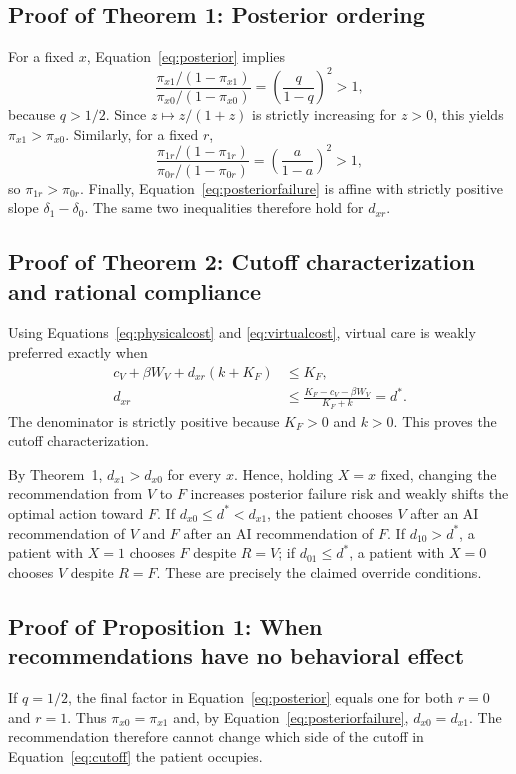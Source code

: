 \documentclass[11pt]{article}
\begin{document}
\subsection{Proof of Theorem 1: Posterior ordering}

For a fixed $x$, Equation~\eqref{eq:posterior} implies
\[
 \frac{\pi_{x1}/(1-\pi_{x1})}{\pi_{x0}/(1-\pi_{x0})}
 =\left(\frac{q}{1-q}\right)^2>1,
\]
because $q>1/2$.  Since $z\mapsto z/(1+z)$ is strictly increasing for $z>0$, this yields $\pi_{x1}>\pi_{x0}$.  Similarly, for a fixed $r$,
\[
 \frac{\pi_{1r}/(1-\pi_{1r})}{\pi_{0r}/(1-\pi_{0r})}
 =\left(\frac{a}{1-a}\right)^2>1,
\]
so $\pi_{1r}>\pi_{0r}$.  Finally, Equation~\eqref{eq:posteriorfailure} is affine with strictly positive slope $\delta_1-\delta_0$.  The same two inequalities therefore hold for $d_{xr}$.

\subsection{Proof of Theorem 2: Cutoff characterization and rational compliance}

Using Equations~\eqref{eq:physicalcost} and \eqref{eq:virtualcost}, virtual care is weakly preferred exactly when
\begin{align*}
 c_V+\beta W_V+d_{xr}(k+K_F)&\leq K_F,\\
 d_{xr}&\leq\frac{K_F-c_V-\beta W_V}{K_F+k}=d^*.
\end{align*}
The denominator is strictly positive because $K_F>0$ and $k>0$.  This proves the cutoff characterization.

By Theorem~1, $d_{x1}>d_{x0}$ for every $x$.  Hence, holding $X=x$ fixed, changing the recommendation from $V$ to $F$ increases posterior failure risk and weakly shifts the optimal action toward $F$.  If $d_{x0}\leq d^*<d_{x1}$, the patient chooses $V$ after an AI recommendation of $V$ and $F$ after an AI recommendation of $F$.  If $d_{10}>d^*$, a patient with $X=1$ chooses $F$ despite $R=V$; if $d_{01}\leq d^*$, a patient with $X=0$ chooses $V$ despite $R=F$.  These are precisely the claimed override conditions.

\subsection{Proof of Proposition 1: When recommendations have no behavioral effect}

If $q=1/2$, the final factor in Equation~\eqref{eq:posterior} equals one for both $r=0$ and $r=1$.  Thus $\pi_{x0}=\pi_{x1}$ and, by Equation~\eqref{eq:posteriorfailure}, $d_{x0}=d_{x1}$.  The recommendation therefore cannot change which side of the cutoff in Equation~\eqref{eq:cutoff} the patient occupies.
\end{document}
